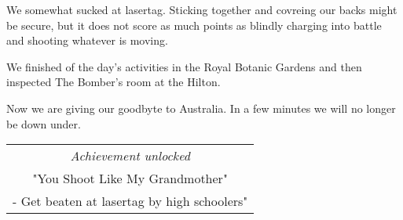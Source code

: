 We somewhat sucked at lasertag.
Sticking together and covreing our backs might be secure, but it does not score as much points as blindly charging into battle and shooting whatever is moving.

We finished of the day's activities in the Royal Botanic Gardens and then inspected The Bomber's room at the Hilton.

Now we are giving our goodbyte to Australia.
In a few minutes we will no longer be down under.

\begin{center}
\begin{tabular}{||c||}
\emph{Achievement unlocked}\\
"You Shoot Like My Grandmother"\\
\multicolumn{1}{||p{0.8\textwidth}||}{\footnotesize - Get beaten at lasertag by high schoolers"} \\
\end{tabular}
\end{center}
